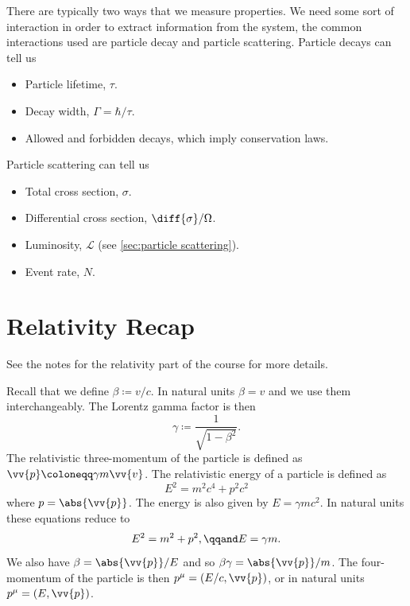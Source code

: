 \documentclass[fleqn]{NotesClass}
\newcommand*{\luminosity}{\mathcal{L}}
\begin{document}
    There are typically two ways that we measure properties.
    We need some sort of interaction in order to extract information from the system, the common interactions used are particle decay and particle scattering.
    Particle decays can tell us
    \begin{itemize}
        \item Particle lifetime, \(\tau\).
        \item Decay width, \(\Gamma = \hbar / \tau\).
        \item Allowed and forbidden decays, which imply conservation laws.
    \end{itemize}
    Particle scattering can tell us
    \begin{itemize}
        \item Total cross section, \(\sigma\).
        \item Differential cross section, \(\diff{\sigma}/{\Omega}\).
        \item Luminosity, \(\luminosity\) (see \cref{sec:particle scattering}).
        \item Event rate, \(N\).
    \end{itemize}
    
    \section{Relativity Recap}
    \begin{rmk}
        See the notes for the relativity part of the course for more details.
    \end{rmk}
    Recall that we define \(\beta \coloneqq v/c\).
    In natural units \(\beta = v\) and we use them interchangeably.
    The Lorentz gamma factor is then
    \begin{equation}
        \gamma \coloneqq \frac{1}{\sqrt{1 - \beta^2}}.
    \end{equation}
    The relativistic three-momentum of the particle is defined as \(\vv{p} \coloneqq \gamma m\vv{v}\).
    The relativistic energy of a particle is defined as
    \begin{equation}
        E^2 = m^2c^4 + p^2c^2
    \end{equation}
    where \(p = \abs{\vv{p}}\).
    The energy is also given by \(E = \gamma mc^2\).
    In natural units these equations reduce to
    \begin{equation}
        E^2 = m^2 + p^2, \qqand E = \gamma m.
    \end{equation}
    We also have \(\beta = \abs{\vv{p}}/E\) and so \(\beta\gamma = \abs{\vv{p}}/m\).
    The four-momentum of the particle is then \(p^\mu = (E/c, \vv{p})\), or in natural units \(p^\mu = (E, \vv{p})\).
    
\end{document}
